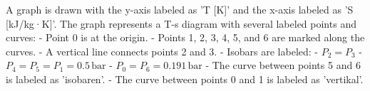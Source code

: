 A graph is drawn with the y-axis labeled as 'T [K]' and the x-axis labeled as 'S [kJ/kg·K]'. The graph represents a T-s diagram with several labeled points and curves:  
- Point 0 is at the origin.  
- Points 1, 2, 3, 4, 5, and 6 are marked along the curves.  
- A vertical line connects points 2 and 3.  
- Isobars are labeled:  
  - \( P_2 = P_3 \)  
  - \( P_4 = P_5 = P_1 = 0.5 \, \text{bar} \)  
  - \( P_0 = P_6 = 0.191 \, \text{bar} \)  
- The curve between points 5 and 6 is labeled as 'isobaren'.  
- The curve between points 0 and 1 is labeled as 'vertikal'.